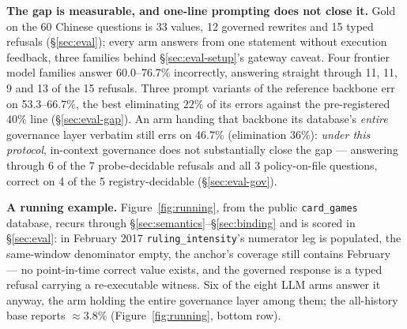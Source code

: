 \smallskip\noindent{}\textbf{The gap is measurable, and one-line prompting does
not close it.} Gold on the 60 Chinese questions is 33 values, 12 governed rewrites and
15 typed refusals (\S\ref{sec:eval}); every arm answers from one statement
without execution feedback, three families behind \S\ref{sec:eval-setup}'s
gateway caveat. Four frontier model families answer 60.0--76.7\%
incorrectly, answering straight through 11, 11, 9 and 13 of the 15
refusals. Three prompt variants of the reference backbone err on
53.3--66.7\%, the best eliminating $22\%$ of its errors against the
pre-registered $40\%$ line (\S\ref{sec:eval-gap}). An arm handing that
backbone its database's \emph{entire} governance layer verbatim still errs on
46.7\% (elimination $36\%$): \emph{under this protocol}, in-context
governance does not substantially close the
gap --- answering through 6
of the 7 probe-decidable refusals and all 3 policy-on-file questions,
correct on 4 of the 5 registry-decidable (\S\ref{sec:eval-gov}).

\smallskip\noindent{}\textbf{A running example.} Figure~\ref{fig:running}, from
the public \texttt{card\_games} database, recurs through
\S\ref{sec:semantics}--\S\ref{sec:binding} and is scored in \S\ref{sec:eval}:
in February 2017 \texttt{ruling\_\allowbreak intensity}'s numerator leg is
populated, the same-window denominator empty, the anchor's coverage still
contains February --- no point-in-time correct value exists, and the governed
response is a typed refusal carrying a re-executable witness. Six of the eight
LLM arms answer it anyway, the arm holding the entire governance layer
among them; the
all-history base reports $\approx3.8\%$ (Figure~\ref{fig:running},
bottom row).

